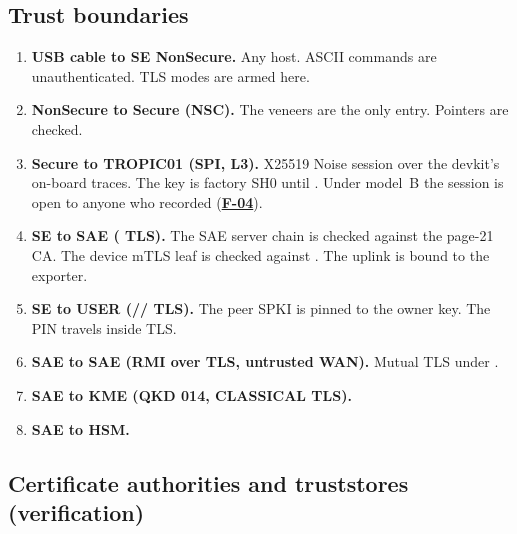 \documentclass[11pt,a4paper]{article}
\newcommand{\fid}[1]{\textbf{#1}}
\begin{document}
\subsection{Trust boundaries}
\begin{enumerate}[label=\textbf{TB\arabic*}]
\item {}\label{tb:TB1}\textbf{USB cable to SE NonSecure.} Any host. ASCII commands are unauthenticated. TLS modes are armed here.
\item {}\label{tb:TB2}\textbf{NonSecure to Secure (NSC).} The veneers are the only entry. Pointers are checked.
\item {}\label{tb:TB3}\textbf{Secure to TROPIC01 (SPI, L3).} X25519 Noise session over the devkit's on-board traces. The key is factory SH0 until . Under model~B the session is open to anyone who recorded  (\hyperref[f:F-04]{\fid{F-04}}).
\item {}\label{tb:TB4}\textbf{SE to SAE ( TLS).} The SAE server chain is checked against the page-21 CA. The device mTLS leaf is checked against . The uplink is bound to the exporter.
\item {}\label{tb:TB5}\textbf{SE to USER (// TLS).} The peer SPKI is pinned to the owner key. The PIN travels inside TLS.
\item {}\label{tb:TB6}\textbf{SAE to SAE (RMI over TLS, untrusted WAN).} Mutual TLS under .
\item {}\label{tb:TB7}\textbf{SAE to KME (QKD 014, CLASSICAL TLS).}
\item {}\label{tb:TB8}\textbf{SAE to HSM.}
\end{enumerate}

\subsection{Certificate authorities and truststores (verification)}\label{sec:ca}
\end{document}
